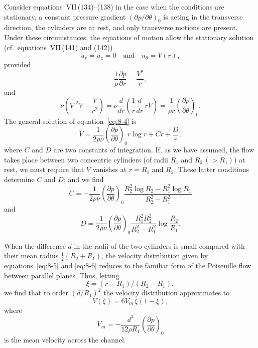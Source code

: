 Consider equations~VII\,(134)--(138) in the case when the conditions are stationary, a constant pressure gradient $(\partial p/\partial\theta)_0$ is acting in the transverse direction, the cylinders are at rest, and only transverse motions are present. Under these circumstances, the equations of motion allow the stationary solution (cf.\ equations~VII\,(141) and (142))
\begin{equation}
\label{eq:8-2}
u_r = u_z = 0 \quad \text{and} \quad u_\theta = V(r),
\end{equation}
provided
\begin{equation}
\label{eq:8-3}
\frac{1}{\rho}\frac{\partial p}{\partial r} = \frac{V^2}{r},
\end{equation}
and
\begin{equation}
\label{eq:8-4}
\nu\!\left(\nabla^2 V - \frac{V}{r^2}\right) = \nu \frac{d}{dr}\!\left(\frac{1}{r}\frac{d}{dr}\,rV\right) = \frac{1}{\rho r}\!\left(\frac{\partial p}{\partial\theta}\right)_{\!0}.
\end{equation}
The general solution of equation~\eqref{eq:8-4} is
\begin{equation}
\label{eq:8-5}
V = \frac{1}{2\rho\nu}\!\left(\frac{\partial p}{\partial\theta}\right)_{\!0} r\log r + Cr + \frac{D}{r},
\end{equation}
where $C$ and $D$ are two constants of integration. If, as we have assumed, the flow takes place between two concentric cylinders (of radii $R_1$ and $R_2\,(> R_1)$) at rest, we must require that $V$ vanishes at $r = R_1$ and $R_2$. These latter conditions determine $C$ and $D$; and we find
\begin{equation}
\label{eq:8-6}
C = -\frac{1}{2\rho\nu}\!\left(\frac{\partial p}{\partial\theta}\right)_{\!0}\frac{R_2^2\log R_2 - R_1^2\log R_1}{R_2^2 - R_1^2}
\end{equation}
and
\begin{equation}
\label{eq:8-6b}
D = \frac{1}{2\rho\nu}\!\left(\frac{\partial p}{\partial\theta}\right)_{\!0}\frac{R_1^2 R_2^2}{R_2^2 - R_1^2}\log\frac{R_2}{R_1}.
\end{equation}

When the difference $d$ in the radii of the two cylinders is small compared with their mean radius $\tfrac{1}{2}(R_2+R_1)$, the velocity distribution given by equations~\eqref{eq:8-5} and \eqref{eq:8-6} reduces to the familiar form of the Poiseuille flow between parallel planes. Thus, letting
\begin{equation}
\label{eq:8-7}
\xi = (r - R_1)/(R_2 - R_1),
\end{equation}
we find that to order $(d/R_1)^2$ the velocity distribution approximates to
\begin{equation}
\label{eq:8-8}
V(\xi) = 6V_m\,\xi(1-\xi),
\end{equation}
where
\begin{equation}
\label{eq:8-9}
V_m = -\frac{d^3}{12\rho R_1}\!\left(\frac{\partial p}{\partial\theta}\right)_{\!0}
\end{equation}
is the mean velocity across the channel.

